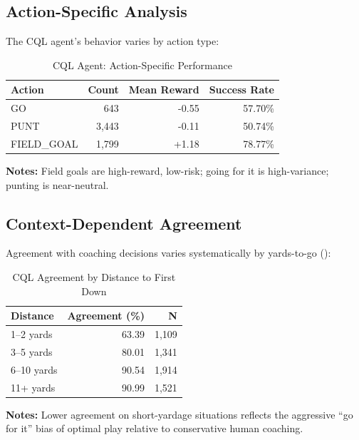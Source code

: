\subsection{Action-Specific Analysis}

The CQL agent's behavior varies by action type:

\begin{table}[h]
\centering
\caption{CQL Agent: Action-Specific Performance}
\label{tab:cql-action-analysis}
\begin{tabular}{@{}lrrr@{}}
\toprule
\textbf{Action} & \textbf{Count} & \textbf{Mean Reward} & \textbf{Success Rate} \\
\midrule
GO & 643 & -0.55 & 57.70\% \\
PUNT & 3,443 & -0.11 & 50.74\% \\
FIELD\_GOAL & 1,799 & +1.18 & 78.77\% \\
\bottomrule
\end{tabular}
\begin{tablenotes}
\small
\item \textbf{Notes:} Field goals are high-reward, low-risk; going for it is high-variance; punting is near-neutral.
\end{tablenotes}
\end{table}

\subsection{Context-Dependent Agreement}

Agreement with coaching decisions varies systematically by yards-to-go ():



\begin{table}[h]
\centering
\caption{CQL Agreement by Distance to First Down}
\label{tab:cql-context-agreement}
\begin{tabular}{@{}lrr@{}}
\toprule
\textbf{Distance} & \textbf{Agreement (\%)} & \textbf{N} \\
\midrule
1--2 yards & 63.39 & 1,109 \\
3--5 yards & 80.01 & 1,341 \\
6--10 yards & 90.54 & 1,914 \\
11+ yards & 90.99 & 1,521 \\
\bottomrule
\end{tabular}
\begin{tablenotes}
\small
\item \textbf{Notes:} Lower agreement on short-yardage situations reflects the aggressive ``go for it'' bias of optimal play relative to conservative human coaching.
\end{tablenotes}
\end{table}

